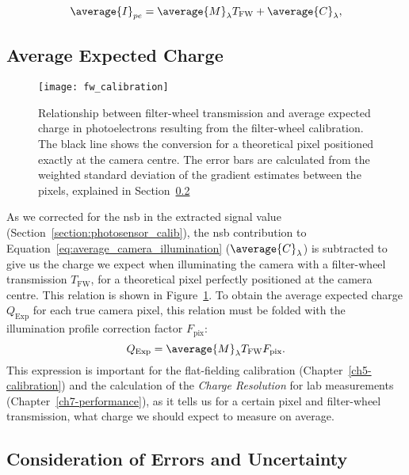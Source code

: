 \begin{equation} \label{eq:average_camera_illumination}
\average{I}_{pe} = \average{M}_\lambda T_\text{FW} + \average{C}_\lambda,
\end{equation}

\subsection{Average Expected Charge}

\begin{figure}
	\centering
    \texttt{[image: fw\_calibration]} 
	\caption[Calibration from filter-wheel transmission to expected charge]{Relationship between filter-wheel transmission and average expected charge in photoelectrons resulting from the filter-wheel calibration. The black line shows the conversion for a theoretical pixel positioned exactly at the camera centre. The error bars are calculated from the weighted standard deviation of the gradient estimates between the pixels, explained in Section~\ref{section:fwerr}}
	\label{fig:fw_calibration}
\end{figure}

As we corrected for the \gls{nsb} in the extracted signal value (Section~\ref{section:photosensor_calib}), the \gls{nsb} contribution to Equation~\ref{eq:average_camera_illumination} ($\average{C}_\lambda$) is subtracted to give us the charge we expect when illuminating the camera with a filter-wheel transmission $T_\text{FW}$, for a theoretical pixel perfectly positioned at the camera centre. This relation is shown in Figure~\ref{fig:fw_calibration}. To obtain the average expected charge $Q_\text{Exp}$ for each true camera pixel, this relation must be folded with the illumination profile correction factor $F_\text{pix}$:
\begin{equation} \label{eq:average_expected_charge}
Q_\text{Exp} = \average{M}_\lambda T_\text{FW}F_\text{pix}.
\end{equation}
This expression is important for the flat-fielding calibration (Chapter~\ref{ch5-calibration}) and the calculation of the \textit{Charge Resolution} for lab measurements (Chapter~\ref{ch7-performance}), as it tells us for a certain pixel and filter-wheel transmission, what charge we should expect to measure on average.

\subsection{Consideration of Errors and Uncertainty} \label{section:fwerr}

